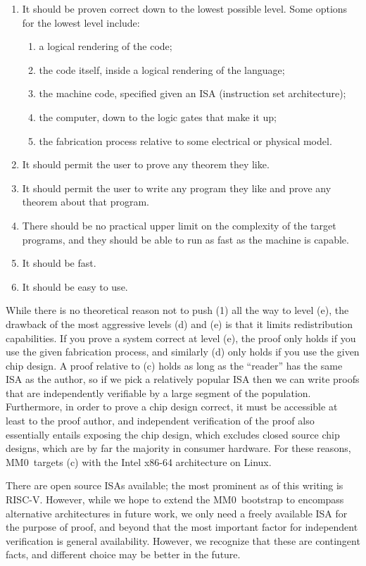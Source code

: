 \documentclass[runningheads]{llncs}
\newcommand{\mmO}{\textsf{MM0}}
\begin{document}
\begin{enumerate}
  \item It should be proven correct down to the lowest possible level. Some options for the lowest level include:
  \begin{enumerate}
    \item a logical rendering of the code;
    \item the code itself, inside a logical rendering of the language;
    \item the machine code, specified given an ISA (instruction set architecture);
    \item the computer, down to the logic gates that make it up;
    \item the fabrication process relative to some electrical or physical model.
  \end{enumerate}
  \item It should permit the user to prove any theorem they like.
  \item It should permit the user to write any program they like and prove any theorem about that program.
  \item There should be no practical upper limit on the complexity of the target programs, and they should be able to run as fast as the machine is capable.
  \item It should be fast.
  \item It should be easy to use.
\end{enumerate}

While there is no theoretical reason not to push (1) all the way to level (e), the drawback of the most aggressive levels (d) and (e) is that it limits redistribution capabilities. If you prove a system correct at level (e), the proof only holds if you use the given fabrication process, and similarly (d) only holds if you use the given chip design. A proof relative to (c) holds as long as the ``reader'' has the same ISA as the author, so if we pick a relatively popular ISA then we can write proofs that are independently verifiable by a large segment of the population. Furthermore, in order to prove a chip design correct, it must be accessible at least to the proof author, and independent verification of the proof also essentially entails exposing the chip design, which excludes closed source chip designs, which are by far the majority in consumer hardware. For these reasons, \mmO\ targets (c) with the Intel x86-64 architecture on Linux.

There are open source ISAs available; the most prominent as of this writing is RISC-V. However, while we hope to extend the \mmO\ bootstrap to encompass alternative architectures in future work, we only need a freely available ISA for the purpose of proof, and beyond that the most important factor for independent verification is general availability. However, we recognize that these are contingent facts, and different choice may be better in the future.
\end{document}
